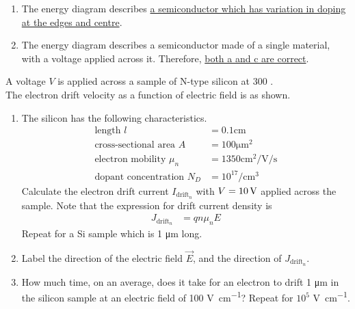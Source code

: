 \documentclass[fleqn, a4paper, 11pt, oneside]{amsart}
\theoremstyle{definition}
\theoremstyle{theorem}
\renewcommand{\emph}{\uline}
\begin{document}
\begin{solution}
	\begin{enumerate}[leftmargin=*]
		\item
			The energy diagram describes \emph{a semiconductor which has variation in doping at the edges and centre}.
		\item
			The energy diagram describes a semiconductor made of a single material, with a voltage applied across it.
			Therefore, \emph{both a and c are correct}.
	\end{enumerate}
\end{solution}

\begin{question}
	A voltage $V$ is applied across a sample of N-type silicon at 300 \kelvin.\\
	The electron drift velocity as a function of electric field is as shown.
	\begin{figure}[H]
		\centering
	\end{figure}
	\begin{enumerate}
		\item
			The silicon has the following characteristics.\\
			\begin{align*}
				\text{length } l                 & = 0.1 \si{\centi\metre}                              \\
				\text{cross-sectional area } A   & = 100 \si{\micro\metre\squared}                      \\
				\text{electron mobility } \mu_n  & = 1350 \si{\centi\metre\squared\per\volt\per\second} \\
				\text{dopant concentration } N_D & = 10^{17} \si{\per\centi\metre\cubed}
			\end{align*}
			Calculate the electron drift current $I_{\text{drift}_n}$ with $V = 10 \volt$ applied across the sample.
			Note that the expression for drift current density is
			\begin{align*}
				J_{\text{drift}_n} & = q n \mu_n E
			\end{align*}
			Repeat for a Si sample which is 1 \si{\micro\metre} long.
		\item
			Label the direction of the electric field $\overrightarrow{E}$, and the direction of $J_{\text{drift}_n}$.
		\item
			How much time, on an average, does it take for an electron to drift 1 \si{\micro\metre} in the silicon sample at an electric field of 100 \si{\volt\per\centi\metre}?
			Repeat for $10^5$ \si{\volt\per\centi\metre}.
	\end{enumerate}
\end{question}
\end{document}

